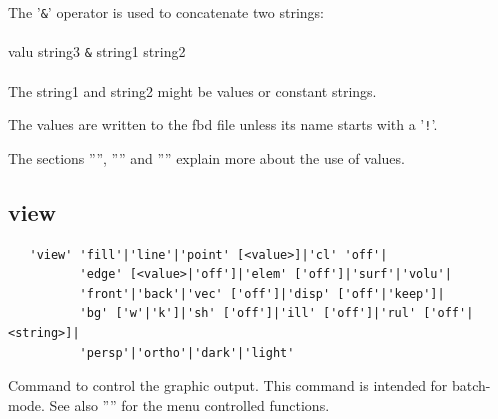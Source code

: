 \documentclass{article}
\begin{document}
The '\verb_&_' operator is used to concatenate two strings:\\\\valu string3 \verb_&_ string1 string2\\\\The string1 and string2 might be values or constant strings.

The values are written to the fbd file unless its name starts with a '\verb_!_'. 

The sections '''', '''' and '''' explain more about the use of values.

\subsection{\label{view}view}
\begin{verbatim}
   'view' 'fill'|'line'|'point' [<value>]|'cl' 'off'|
          'edge' [<value>|'off']|'elem' ['off']|'surf'|'volu'|
          'front'|'back'|'vec' ['off']|'disp' ['off'|'keep']|
          'bg' ['w'|'k']|'sh' ['off']|'ill' ['off']|'rul' ['off'|<string>]|
          'persp'|'ortho'|'dark'|'light'
\end{verbatim}
Command to control the graphic output. This command is intended for batch-mode. See also '''' for the menu controlled functions.
\end{document}
